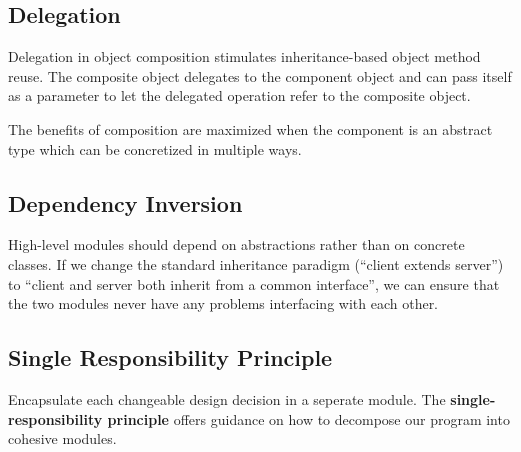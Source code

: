 \documentclass[12pt]{article}
\begin{document}
\subsection{Delegation}
Delegation in object composition stimulates inheritance-based object method reuse. The composite object delegates to the component object and can pass itself as a parameter to let the delegated operation refer to the composite object.

The benefits of composition are maximized when the component is an abstract type which can be concretized in multiple ways.

\subsection{Dependency Inversion}
High-level modules should depend on abstractions rather than on concrete classes. If we change the standard inheritance paradigm (``client extends server'') to ``client and server both inherit from a common interface'', we can ensure that the two modules never have any problems interfacing with each other.

\subsection{Single Responsibility Principle}
Encapsulate each changeable design decision in a seperate module. The {\bf single-responsibility principle} offers guidance on how to decompose our program into cohesive modules.
\end{document}
